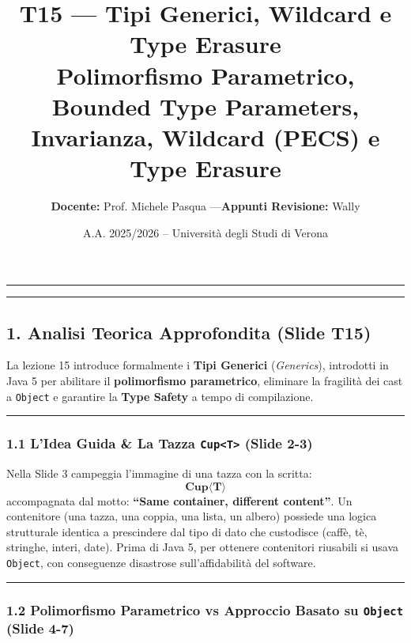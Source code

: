 \documentclass[11pt,a4paper]{article}
\title{\Huge\bfseries\sffamily\color{brandblue} T15 --- Tipi Generici, Wildcard e Type Erasure \\[0.3em] \large\sffamily Polimorfismo Parametrico, Bounded Type Parameters, Invarianza, Wildcard (PECS) e Type Erasure}
\author{\textbf{Docente:} Prof. Michele Pasqua \quad---\quad \textbf{Appunti Revisione:} Wally}
\date{A.A. 2025/2026 -- Universit\`a degli Studi di Verona}
\newcommand{\passthrough}[1]{#1}
\begin{document}
\maketitle
\thispagestyle{fancy}
\vspace{-1.2em}
\noindent\textcolor{brandblue}{\rule{\textwidth}{0.8pt}}
\vspace{1.2em}

\begin{center}\rule{0.5\linewidth}{0.5pt}\end{center}

\subsection{1. Analisi Teorica Approfondita (Slide
T15)}\label{analisi-teorica-approfondita-slide-t15}

La lezione 15 introduce formalmente i \textbf{Tipi Generici}
(\emph{Generics}), introdotti in Java 5 per abilitare il
\textbf{polimorfismo parametrico}, eliminare la fragilità dei cast a
\passthrough{\lstinline!Object!} e garantire la \textbf{Type Safety} a
tempo di compilazione.

\begin{center}\rule{0.5\linewidth}{0.5pt}\end{center}

\subsubsection{\texorpdfstring{1.1 L'Idea Guida \& La Tazza
\texttt{Cup\textless{}T\textgreater{}} (Slide
2-3)}{1.1 L'Idea Guida \& La Tazza Cup\textless T\textgreater{} (Slide 2-3)}}\label{lidea-guida-la-tazza-cupt-slide-2-3}

Nella Slide 3 campeggia l'immagine di una tazza con la scritta:
\[\mathbf{Cup\langle T\rangle}\] accompagnata dal motto: \textbf{``Same
container, different content''}. Un contenitore (una tazza, una coppia,
una lista, un albero) possiede una logica strutturale identica a
prescindere dal tipo di dato che custodisce (caffè, tè, stringhe,
interi, date). Prima di Java 5, per ottenere contenitori riusabili si
usava \passthrough{\lstinline!Object!}, con conseguenze disastrose
sull'affidabilità del software.

\begin{center}\rule{0.5\linewidth}{0.5pt}\end{center}

\subsubsection{\texorpdfstring{1.2 Polimorfismo Parametrico vs Approccio
Basato su \texttt{Object} (Slide
4-7)}{1.2 Polimorfismo Parametrico vs Approccio Basato su Object (Slide 4-7)}}\label{polimorfismo-parametrico-vs-approccio-basato-su-object-slide-4-7}
\end{document}

